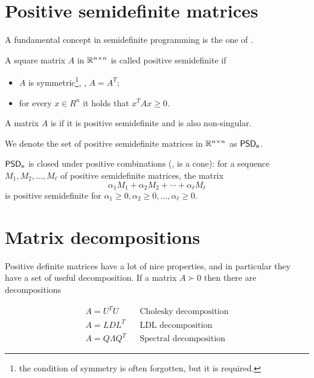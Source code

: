 \documentclass[a4paper,twoside,justified]{tufte-handout}
\begin{document}
 

\section{Positive semidefinite matrices}

A fundamental concept in semidefinite programming is the one of
. 
\begin{definition}
  A square matrix $A$ in $ \mathbb{R}^{n\times n} $ is called positive
  semidefinite if 
  \begin{itemize}
    \item $A$ is symmetric\footnote{the condition of symmetry is often
      forgotten, but it is required.}, \ie, $ A=A^{T} $;
    \item for every $ x\in R^{n} $ it holds that $ x^{T} A x \geq 0 $.
  \end{itemize}
  A matrix $ A $ is  if it is
  positive semidefinite and is also non-singular.
\end{definition}
We denote the set of positive semidefinite matrices in $\mathbb{R}^{n\times
  n}$ as $\mathsf{PSD_{n}}$.

\begin{fact}
  $ \mathsf{PSD_{n}} $ is closed under positive
  combinations (\ie, is a cone): for a sequence $ M_{1}, M_{2}, \ldots, M_{\ell} $ of positive
  semidefinite matrices, the matrix 
\begin{equation}
  \alpha_{1} M_{1} + \alpha_{2} M_{2} + \cdots + \alpha_{\ell} M_{\ell}
\end{equation}
is positive semidefinite for $ \alpha_{1}\geq 0, \alpha_{2}\geq 0,
\ldots , \alpha_{\ell} \geq 0$.
\end{fact}

\section{Matrix decompositions}

Positive definite matrices have a lot of nice properties, and in
particular they have a set of useful decomposition. If a matrix $ A
\succ 0 $ then there are decompositions

\begin{align}
  A = U^{T}U & & \text{Cholesky decomposition}\\
  A = L D L^{T} & & \text{LDL decomposition}\\
  A = Q \Lambda Q^{T} & & \text{Spectral decomposition}
\end{align}
\end{document}
